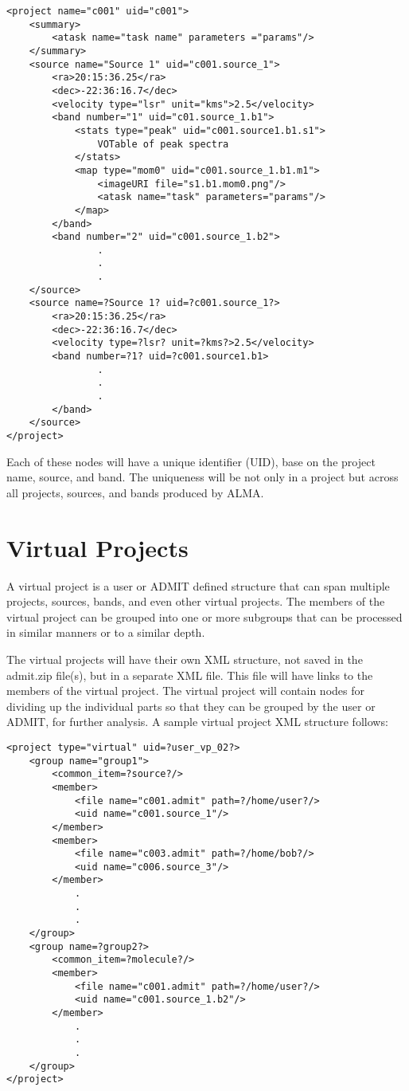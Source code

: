 \documentclass[11pt,twoside]{article}
\begin{document}
\begin{verbatim}
<project name="c001" uid="c001">
    <summary>
        <atask name="task name" parameters ="params"/>
    </summary>
    <source name="Source 1" uid="c001.source_1">
        <ra>20:15:36.25</ra>
        <dec>-22:36:16.7</dec>
        <velocity type="lsr" unit="kms">2.5</velocity>
        <band number="1" uid="c01.source_1.b1">
            <stats type="peak" uid="c001.source1.b1.s1">
                VOTable of peak spectra
            </stats>
            <map type="mom0" uid="c001.source_1.b1.m1">
                <imageURI file="s1.b1.mom0.png"/>
                <atask name="task" parameters="params"/>
            </map>
        </band>
        <band number="2" uid="c001.source_1.b2">
                .
                .
                .
    </source>
    <source name=?Source 1? uid=?c001.source_1?>
        <ra>20:15:36.25</ra>
        <dec>-22:36:16.7</dec>
        <velocity type=?lsr? unit=?kms?>2.5</velocity>
        <band number=?1? uid=?c001.source1.b1>
                .
                .
                .
        </band>
    </source>
</project>
\end{verbatim}
Each of these nodes will have a unique identifier (UID), base on the project name, source, and band. The uniqueness will be not only in a project but across all projects, sources, and bands produced by ALMA.

\section{Virtual Projects}
A virtual project is a user or ADMIT defined structure that can span multiple projects, sources, bands, and even other virtual projects. The members of the virtual project can be grouped into one or more subgroups that can be processed in similar manners or to a similar depth.

The virtual projects will have their own XML structure, not saved in the admit.zip file(s), but in a separate XML file. This file will have links to the members of the virtual project. The virtual project will contain nodes for dividing up the individual parts so that they can be grouped by the user or ADMIT, for further analysis. A sample virtual project XML structure follows:

\begin{verbatim}
<project type="virtual" uid=?user_vp_02?>
    <group name="group1">
        <common_item=?source?/>
        <member>
            <file name="c001.admit" path=?/home/user?/>
            <uid name="c001.source_1"/>
        </member>
        <member>
            <file name="c003.admit" path=?/home/bob?/>
            <uid name="c006.source_3"/>
        </member>
            .
            .
            .
    </group>
    <group name=?group2?>
        <common_item=?molecule?/>
        <member>
            <file name="c001.admit" path=?/home/user?/>
            <uid name="c001.source_1.b2"/>
        </member>
            .
            .
            .
    </group>
</project>
\end{verbatim}
\end{document}

